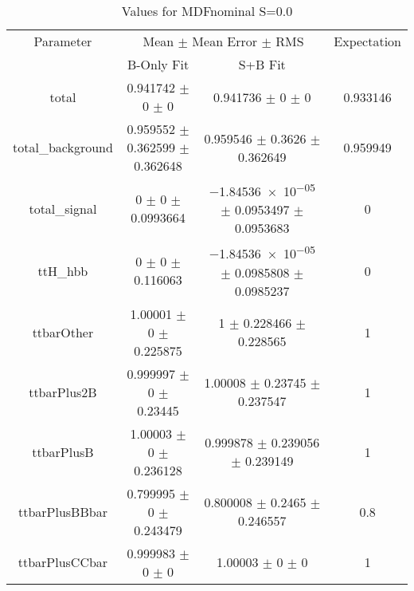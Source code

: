 \begin{table}
\centering
\caption{Values for MDFnominal S=0.0}
\begin{tabular}{cccc}
\toprule
Parameter & \multicolumn{2}{c}{Mean $\pm$ Mean Error $\pm$ RMS} & Expectation\\
 & B-Only Fit & S+B Fit & \\
\midrule
total & \num{0.941742} $\pm$ \num{0} $\pm$ \num{0} & \num{0.941736} $\pm$ \num{0} $\pm$ \num{0} & \num{0.933146}\\
total\_background & \num{0.959552} $\pm$ \num{0.362599} $\pm$ \num{0.362648} & \num{0.959546} $\pm$ \num{0.3626} $\pm$ \num{0.362649} & \num{0.959949}\\
total\_signal & \num{0} $\pm$ \num{0} $\pm$ \num{0.0993664} & \num{-1.84536e-05} $\pm$ \num{0.0953497} $\pm$ \num{0.0953683} & \num{0}\\
ttH\_hbb & \num{0} $\pm$ \num{0} $\pm$ \num{0.116063} & \num{-1.84536e-05} $\pm$ \num{0.0985808} $\pm$ \num{0.0985237} & \num{0}\\
ttbarOther & \num{1.00001} $\pm$ \num{0} $\pm$ \num{0.225875} & \num{1} $\pm$ \num{0.228466} $\pm$ \num{0.228565} & \num{1}\\
ttbarPlus2B & \num{0.999997} $\pm$ \num{0} $\pm$ \num{0.23445} & \num{1.00008} $\pm$ \num{0.23745} $\pm$ \num{0.237547} & \num{1}\\
ttbarPlusB & \num{1.00003} $\pm$ \num{0} $\pm$ \num{0.236128} & \num{0.999878} $\pm$ \num{0.239056} $\pm$ \num{0.239149} & \num{1}\\
ttbarPlusBBbar & \num{0.799995} $\pm$ \num{0} $\pm$ \num{0.243479} & \num{0.800008} $\pm$ \num{0.2465} $\pm$ \num{0.246557} & \num{0.8}\\
ttbarPlusCCbar & \num{0.999983} $\pm$ \num{0} $\pm$ \num{0} & \num{1.00003} $\pm$ \num{0} $\pm$ \num{0} & \num{1}\\
\bottomrule
\end{tabular}
\end{table}